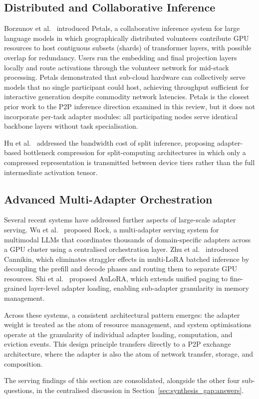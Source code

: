 \subsection{Distributed and Collaborative Inference}
\label{sec:inference_systems:distributed}

Borzunov et al.~\cite{Borzunov2023} introduced Petals, a collaborative inference system for large
language models in which geographically distributed volunteers contribute GPU
resources to host contiguous subsets (shards) of transformer layers, with possible overlap for redundancy. Users run the
embedding and final projection layers locally and route activations through the
volunteer network for mid-stack processing. Petals demonstrated that sub-cloud hardware
can collectively serve models that no single participant could host, achieving
throughput sufficient for interactive generation despite commodity network latencies.
Petals is the closest prior work to the P2P inference direction examined in this review,
but it does not incorporate per-task adapter modules: all participating nodes serve
identical backbone layers without task specialisation.

Hu et al.~\cite{HuDistributed2022} addressed the bandwidth cost of split inference, proposing
adapter-based bottleneck compression for split-computing architectures in which only
a compressed representation is transmitted between device tiers rather than the full
intermediate activation tensor.

\subsection{Advanced Multi-Adapter Orchestration}
\label{sec:inference_systems:advanced}

Several recent systems have addressed further aspects of large-scale adapter serving.
Wu et al.~\cite{WuRock2025} proposed Rock, a multi-adapter serving system for multimodal LLMs
that coordinates thousands of domain-specific adapters across a GPU cluster using a
centralised orchestration layer. Zhu et al.~\cite{ZhuCannikin2025} introduced Cannikin, which
eliminates straggler effects in multi-LoRA batched inference by decoupling the prefill
and decode phases and routing them to separate GPU resources. Shi et al.~\cite{Shi2025AuLoRA}
proposed AuLoRA, which extends unified paging to fine-grained layer-level adapter
loading, enabling sub-adapter granularity in memory management.

Across these systems, a consistent architectural pattern emerges: the adapter weight is
treated as the atom of resource management, and system optimisations operate at the
granularity of individual adapter loading, computation, and eviction events. This
design principle transfers directly to a P2P exchange architecture, where the adapter is also
the atom of network transfer, storage, and composition.

\noindent The serving findings of this section are consolidated, alongside the
other four sub-questions, in the centralised discussion in
Section~\ref{sec:synthesis_gap:answers}.
